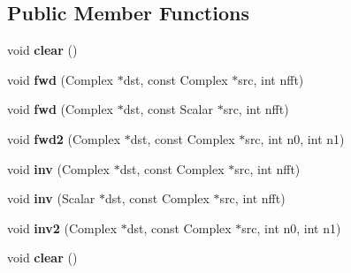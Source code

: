 \subsection*{Public Member Functions}
\begin{DoxyCompactItemize}
\item 
\mbox{\label{struct_eigen_1_1internal_1_1fftw__impl_a64e11f55050b69bd41299bf97d5d0657}} 
void {\bfseries clear} ()
\item 
\mbox{\label{struct_eigen_1_1internal_1_1fftw__impl_a05501269081c686ab80e5c8c5bcab72f}} 
void {\bfseries fwd} (Complex $\ast$dst, const Complex $\ast$src, int nfft)
\item 
\mbox{\label{struct_eigen_1_1internal_1_1fftw__impl_a85a7d7260407e1019d393ddcffb68e09}} 
void {\bfseries fwd} (Complex $\ast$dst, const Scalar $\ast$src, int nfft)
\item 
\mbox{\label{struct_eigen_1_1internal_1_1fftw__impl_a671245ef0355ec65de96dcdef10bf669}} 
void {\bfseries fwd2} (Complex $\ast$dst, const Complex $\ast$src, int n0, int n1)
\item 
\mbox{\label{struct_eigen_1_1internal_1_1fftw__impl_a76148ef976cee611506b6f30147eb427}} 
void {\bfseries inv} (Complex $\ast$dst, const Complex $\ast$src, int nfft)
\item 
\mbox{\label{struct_eigen_1_1internal_1_1fftw__impl_a3a89d08e9eb6783e780a3cf04850a811}} 
void {\bfseries inv} (Scalar $\ast$dst, const Complex $\ast$src, int nfft)
\item 
\mbox{\label{struct_eigen_1_1internal_1_1fftw__impl_a774406207808bedb1dcce992a446ffdd}} 
void {\bfseries inv2} (Complex $\ast$dst, const Complex $\ast$src, int n0, int n1)
\item 
\mbox{\label{struct_eigen_1_1internal_1_1fftw__impl_a64e11f55050b69bd41299bf97d5d0657}} 
void {\bfseries clear} ()
\item 

\end{DoxyCompactItemize}

